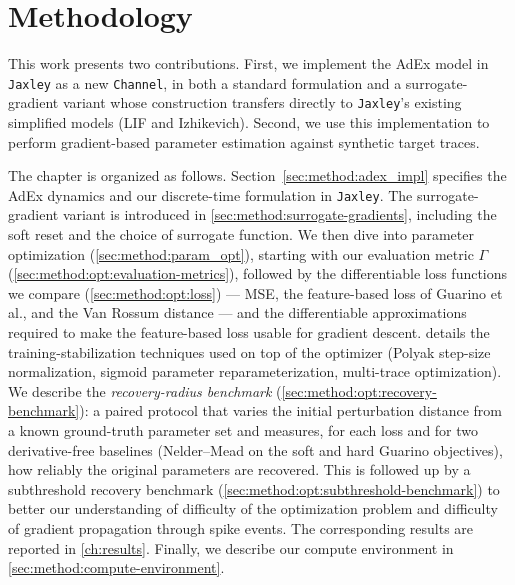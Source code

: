 \chapter{Methodology}
\label{ch:method}

This work presents two contributions.
First, we implement the \gls{AdEx} model in \texttt{Jaxley} as a new \texttt{Channel},
in both a standard formulation and a surrogate-gradient variant whose construction transfers directly to \texttt{Jaxley}'s existing simplified models (\gls{LIF} and Izhikevich).
Second, we use this implementation to perform gradient-based parameter estimation against synthetic target traces.

The chapter is organized as follows.
Section~\ref{sec:method:adex_impl} specifies the \gls{AdEx} dynamics and our discrete-time formulation in \texttt{Jaxley}.
The surrogate-gradient variant is introduced in \cref{sec:method:surrogate-gradients},
including the soft reset and the choice of surrogate function.
We then dive into parameter optimization (\cref{sec:method:param_opt}), starting with our evaluation metric $\Gamma$ (\cref{sec:method:opt:evaluation-metrics}), followed by the differentiable loss functions we compare (\cref{sec:method:opt:loss}) --- \gls{MSE},
the feature-based loss of Guarino et al., and the Van Rossum distance --- and the differentiable approximations required to make the feature-based loss usable for gradient descent.
 details the training-stabilization techniques used on top of the optimizer (Polyak step-size normalization, sigmoid parameter reparameterization, multi-trace optimization).
We describe the \emph{recovery-radius benchmark} (\cref{sec:method:opt:recovery-benchmark}):
a paired protocol that varies the initial perturbation distance from a known ground-truth parameter set and measures,
for each loss and for two derivative-free baselines (Nelder--Mead on the soft and hard Guarino objectives), how reliably the original parameters are recovered.
This is followed up by a subthreshold recovery benchmark (\cref{sec:method:opt:subthreshold-benchmark}) to better our understanding of difficulty of the optimization problem and difficulty of gradient propagation through spike events.
The corresponding results are reported in \cref{ch:results}.
Finally, we describe our compute environment in \cref{sec:method:compute-environment}.


